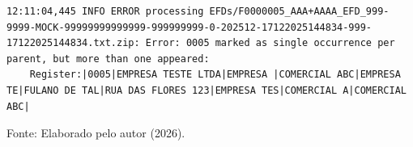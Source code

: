 \begin{quadro}[H]
    \centering
    \caption{Exemplo de log de erro de \textit{parsing}}
    \label{qua:log_parsing_incorreto}
\begin{lstlisting}[basicstyle=\ttfamily\footnotesize, frame=single]
12:11:04,445 INFO ERROR processing EFDs/F0000005_AAA+AAAA_EFD_999-9999-MOCK-99999999999999-999999999-0-202512-17122025144834-999-17122025144834.txt.zip: Error: 0005 marked as single occurrence per parent, but more than one appeared:
	Register:|0005|EMPRESA TESTE LTDA|EMPRESA |COMERCIAL ABC|EMPRESA TE|FULANO DE TAL|RUA DAS FLORES 123|EMPRESA TES|COMERCIAL A|COMERCIAL ABC|
\end{lstlisting}

    \vspace{0.2cm}
    \small{Fonte: Elaborado pelo autor (2026).}
\end{quadro}
